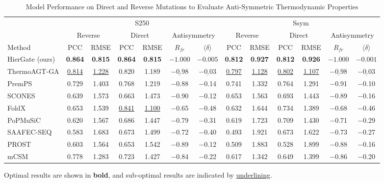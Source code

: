 \documentclass[journal,twoside,web]{ieeecolor}
\begin{document}
\begin{table}[!t]
\footnotesize
\setlength{\tabcolsep}{3pt}
\caption{Model Performance on Direct and Reverse Mutations to Evaluate Anti-Symmetric Thermodynamic Properties}
\label{tab:antisym}
\begin{tabular*}{\textwidth}{@{\extracolsep{\fill}}lcccccccccccc}
\toprule
& \multicolumn{6}{c}{S250} & \multicolumn{6}{c}{Ssym} \\
\cmidrule(lr){2-7} \cmidrule(lr){8-13}
& \multicolumn{2}{c}{Reverse} & \multicolumn{2}{c}{Direct} & \multicolumn{2}{c}{Antisymmetry}
& \multicolumn{2}{c}{Reverse} & \multicolumn{2}{c}{Direct} & \multicolumn{2}{c}{Antisymmetry} \\
\cmidrule(lr){2-3} \cmidrule(lr){4-5} \cmidrule(lr){6-7}
\cmidrule(lr){8-9} \cmidrule(lr){10-11} \cmidrule(lr){12-13}
Method & PCC & RMSE & PCC & RMSE & $R_{fr}$ & $\langle\delta\rangle$
       & PCC & RMSE & PCC & RMSE & $R_{fr}$ & $\langle\delta\rangle$ \\
\midrule
HierGate (ours)      & \textbf{0.864} & \textbf{0.815} & \textbf{0.864} & \textbf{0.815} & $\bm{-1.000}$ & $\bm{-0.005}$
              & \textbf{0.812} & \textbf{0.927} & \textbf{0.812} & \textbf{0.926} & $\bm{-1.000}$ & $\bm{-0.001}$ \\
ThermoAGT-GA  & \underline{0.814} & \underline{1.228} & 0.820 & 1.189 & $\underline{-0.98}$ & $\underline{-0.03}$
              & \underline{0.797} & \underline{1.128} & \underline{0.802} & \underline{1.107} & $\underline{-0.98}$ & $\underline{-0.03}$ \\
PremPS        & 0.729 & 1.403 & 0.768 & 1.219 & $-$0.88 & $-$0.14
              & 0.741 & 1.332 & 0.764 & 1.291 & $-$0.91 & $-$0.10 \\
SCONES        & 0.639 & 1.573 & 0.663 & 1.473 & $-$0.90 & $-$0.12
              & 0.653 & 1.563 & 0.693 & 1.443 & $-$0.89 & $-$0.16 \\
FoldX         & 0.653 & 1.539 & \underline{0.841} & \underline{1.100} & $-$0.65 & $-$0.48
              & 0.632 & 1.644 & 0.734 & 1.389 & $-$0.68 & $-$0.46 \\
PoPMuSiC      & 0.620 & 1.567 & 0.686 & 1.447 & $-$0.79 & $-$0.31
              & 0.619 & 1.723 & 0.709 & 1.430 & $-$0.71 & $-$0.29 \\
SAAFEC-SEQ    & 0.583 & 1.683 & 0.673 & 1.499 & $-$0.72 & $-$0.40
              & 0.493 & 1.921 & 0.673 & 1.622 & $-$0.73 & $-$0.27 \\
PROST         & 0.603 & 1.564 & 0.653 & 1.542 & $-$0.89 & $-$0.12
              & 0.509 & 1.883 & 0.528 & 1.899 & $-$0.88 & $-$0.16 \\
mCSM          & 0.778 & 1.283 & 0.723 & 1.427 & $-$0.84 & $-$0.22
              & 0.617 & 1.342 & 0.649 & 1.399 & $-$0.86 & $-$0.20 \\
\bottomrule
\end{tabular*}
\smallskip

\raggedright\footnotesize Optimal results are shown in \textbf{bold}, and sub-optimal results are indicated by \underline{underlining}.
\end{table}
\end{document}
